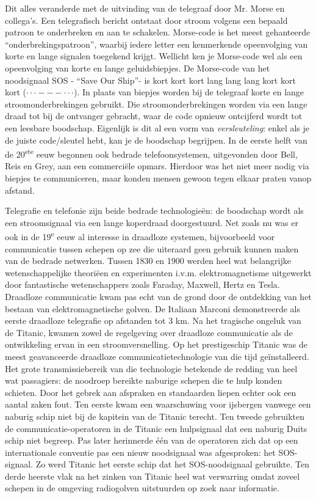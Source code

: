  Dit alles veranderde met de uitvinding van de telegraaf door Mr. Morse en collega's. Een telegrafisch bericht ontstaat door stroom volgens een bepaald patroon te onderbreken en aan te schakelen. Morse-code is het meest gehanteerde \textquotedblleft onderbrekingspatroon\textquotedblright, waarbij iedere letter een kenmerkende opeenvolging van korte en lange signalen toegekend krijgt. Wellicht ken je Morse-code wel als een opeenvolging van korte en lange geluidsbiepjes. De Morse-code van het noodsignaal SOS - \textquotedblleft Save Our Ship\textquotedblright - is kort kort kort lang lang lang kort kort kort ($\cdot \cdot \cdot - - - \cdot \cdot \cdot$). In plaats van biepjes worden bij de telegraaf korte en lange stroomonderbrekingen gebruikt. Die stroomonderbrekingen worden via een lange draad tot bij de ontvanger gebracht, waar de code opnieuw ontcijferd wordt tot een leesbare boodschap. Eigenlijk is dit al een vorm van \emph{versleuteling}: enkel als je de juiste code/sleutel hebt, kan je de boodschap begrijpen.
 In de eerste helft van de 20\textsuperscript{ste} eeuw begonnen ook bedrade telefoonsystemen, uitgevonden door Bell, Reis en Grey, aan een commerci\"ele opmars. Hierdoor was het niet meer nodig via biepjes te communiceren, maar konden mensen gewoon tegen elkaar praten vanop afstand.

 Telegrafie en telefonie zijn beide bedrade technologieën: de boodschap wordt als een stroomsignaal via een lange koperdraad doorgestuurd. Net zoals nu was er ook in de 19\textsuperscript{e} eeuw al interesse in draadloze systemen, bijvoorbeeld voor communicatie tussen schepen op zee die uiteraard geen gebruik kunnen maken van de bedrade netwerken. Tussen 1830 en 1900 werden heel wat belangrijke wetenschappelijke theoriëen en experimenten i.v.m. elektromagnetisme uitgewerkt door fantastische wetenschappers zoals Faraday, Maxwell, Hertz en Tesla. Draadloze communicatie kwam pas echt van de grond door de ontdekking van het bestaan van elektromagnetische golven. De Italiaan Marconi demonstreerde als eerste draadloze telegrafie op afstanden tot 3 km. 
 Na het tragische ongeluk van de Titanic, kwamen zowel de regelgeving over draadloze communicatie als de ontwikkeling ervan in een stroomversnelling. Op het prestigeschip Titanic was de meest geavanceerde draadloze communicatietechnologie van die tijd ge\"installeerd. Het grote transmissiebereik van die technologie betekende de redding van heel wat passagiers: de noodroep bereikte naburige schepen die te hulp konden schieten. Door het gebrek aan afspraken en standaarden liepen echter ook een aantal zaken fout. Ten eerste kwam een waarschuwing voor ijsbergen vanwege een naburig schip niet bij de kapitein van de Titanic terecht. Ten tweede gebruikten de communicatie-operatoren in de Titanic een hulpsignaal dat een naburig Duits schip niet begreep. Pas later herinnerde \'e\'en van de operatoren zich dat op een internationale conventie pas een nieuw noodsignaal was afgesproken: het SOS-signaal. Zo werd Titanic het eerste schip dat het SOS-noodsignaal gebruikte. Ten derde heerste vlak na het zinken van Titanic heel wat verwarring omdat zoveel schepen in de omgeving radiogolven uitstuurden op zoek naar informatie.

